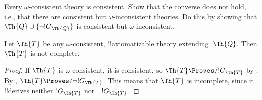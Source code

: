 \documentclass[../../../include/open-logic-section]{subfiles}
\begin{document}
\begin{prob}
  Every $\omega$-consistent theory is consistent. Show that the
  converse does not hold, i.e., that there are consistent but
  $\omega$-inconsistent theories. Do this by showing that $\Th{Q} \cup
  \{\lnot !G_\Th{Q}\}$ is consistent but $\omega$-inconsistent.
\end{prob}

\begin{thm}
 Let $\Th{T}$ be any
$\omega$-consistent, !!{axiomatizable} theory extending~$\Th{Q}$. Then
$\Th{T}$ is not complete.
\end{thm}

\begin{proof}
  If $\Th{T}$ is $\omega$-consistent, it is consistent, so $\Th{T}
  \Proves/ !G_\Th{T}$ by .  By
  , $\Th{T} \Proves/ \lnot !G_\Th{T}$.
  This means that $\Th{T}$ is incomplete, since it !!{derive}s neither
  $!G_\Th{T}$ nor $\lnot !G_\Th{T}$.
\end{proof}
\end{document}
